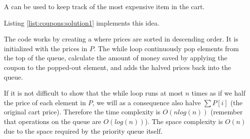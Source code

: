 A  can be used to keep track of the most expensive item in the cart.

Listing \ref{list:coupons:solution1} implements this idea.



The code works by creating a  where prices are sorted in descending order. It is initialized with the prices in $P$.
The while loop continuously pop elements from the top of the queue, calculate the amount of money saved by applying the coupon to the popped-out element, and adds the halved prices back into the queue.

If it is not difficult to show that the while loop runs at most $n$ times as if we half the price of each element in $P$, we will as a consequence also halve $\sum P[i]$ (the original cart price). 
Therefore the time complexity is $O(nlog(n))$ (remember that operations on the queue are $O(log(n))$). The space complexity is $O(n)$ due to the space required by the priority queue itself.



